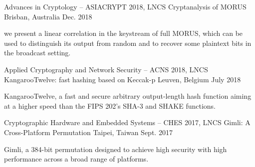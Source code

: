 \newpage
{}


\begin{cventries}

    \cventry
      {Advances in Cryptology – ASIACRYPT 2018, LNCS}
      {Cryptanalysis of MORUS} %
      {Brisban, Australia} %
      {Dec. 2018} %
      {
        \begin{cvitems} %
          \item {we present a linear correlation in the keystream of full MORUS, which can be used to distinguish its output from random and to recover some plaintext bits in the broadcast setting.}
        \end{cvitems}
      }

    \cventry
      {Applied Cryptography and Network Security – ACNS 2018, LNCS}
      {KangarooTwelve: fast hashing based on Keccak-p} %
      {Leuven, Belgium} %
      {July 2018} %
      {
        \begin{cvitems} %
          \item {KangarooTwelve, a fast and secure arbitrary output-length hash function aiming at a higher speed than the FIPS 202’s SHA-3 and SHAKE functions.}
        \end{cvitems}
      }

  \cventry
    {Cryptographic Hardware and Embedded Systems – CHES 2017, LNCS}
    {Gimli: A Cross-Platform Permutation} %
    {Taipei, Taiwan} %
    {Sept. 2017} %
    {
      \begin{cvitems} %
        \item {Gimli, a 384-bit permutation designed to achieve high security with high performance across a broad range of platforms.}
      \end{cvitems}
    }


\end{cventries}
